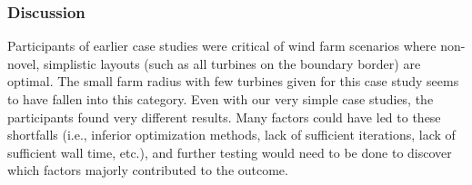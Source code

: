 
\subsubsection{Discussion}

	Participants of earlier case studies were critical of wind farm scenarios where non-novel, simplistic layouts (such as all turbines on the boundary border) are optimal.
	The small farm radius with few turbines given for this case study seems to have fallen into this category.
	Even with our very simple case studies, the participants found very different results.
	Many factors could have led to these shortfalls (i.e., inferior optimization methods, lack of sufficient iterations, lack of sufficient wall time, etc.), and further testing would need to be done to discover which factors majorly contributed to the outcome.

